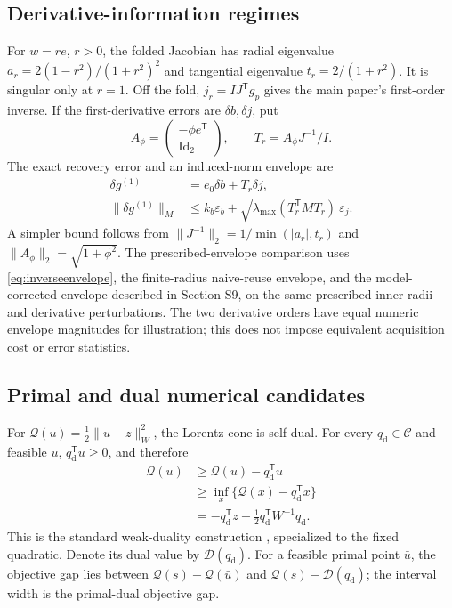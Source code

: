 \documentclass[10pt,a4paper]{article}
\begin{document}
\subsection{Derivative-information regimes}
For $w=re$, $r>0$, the folded Jacobian has radial eigenvalue $a_r=2(1-r^2)/(1+r^2)^2$ and tangential eigenvalue $t_r=2/(1+r^2)$. It is singular only at $r=1$. Off the fold, $j_r=IJ^{\mathsf T}g_p$ gives the main paper's first-order inverse. If the first-derivative errors are $\delta b,\delta j$, put
\begin{equation}
 A_\phi=\begin{pmatrix}-\phi e^{\mathsf T}\\\operatorname{Id}_2\end{pmatrix},\qquad
 T_r=A_\phi J^{-1}/I.
 \label{eq:inverseerroroperator}
\end{equation}
The exact recovery error and an induced-norm envelope are
\begin{equation}
 \begin{aligned}
 \delta g^{(1)}&=e_0\delta b+T_r\delta j,\\
 \|\delta g^{(1)}\|_M&\leq k_b\varepsilon_b+
 \sqrt{\lambda_{\max}(T_r^{\mathsf T}MT_r)}\,\varepsilon_j.
 \end{aligned}
 \label{eq:inverseenvelope}
\end{equation}
A simpler bound follows from $\|J^{-1}\|_2=1/\min(|a_r|,t_r)$ and $\|A_\phi\|_2=\sqrt{1+\phi^2}$. The prescribed-envelope comparison uses \eqref{eq:inverseenvelope}, the finite-radius naive-reuse envelope, and the model-corrected envelope described in Section S9, on the same prescribed inner radii and derivative perturbations. The two derivative orders have equal numeric envelope magnitudes for illustration; this does not impose equivalent acquisition cost or error statistics.

\subsection{Primal and dual numerical candidates}
For $\mathcal Q(u)=\tfrac12\|u-z\|_W^2$, the Lorentz cone is self-dual. For every $q_{\mathrm d}\in\mathcal C$ and feasible $u$, $q_{\mathrm d}^{\mathsf T}u\geq0$, and therefore
\begin{equation}
 \begin{aligned}
 \mathcal Q(u)&\geq \mathcal Q(u)-q_{\mathrm d}^{\mathsf T}u\\
 &\geq\inf_x\{\mathcal Q(x)-q_{\mathrm d}^{\mathsf T}x\}\\
 &=-q_{\mathrm d}^{\mathsf T}z-\tfrac12q_{\mathrm d}^{\mathsf T}W^{-1}q_{\mathrm d}.
 \end{aligned}
 \label{eq:dualgapderivation}
\end{equation}
This is the standard weak-duality construction \cite{supp-cvxbook}, specialized to the fixed quadratic. Denote its dual value by $\mathcal D(q_{\mathrm d})$. For a feasible primal point $\bar u$, the objective gap lies between $\mathcal Q(s)-\mathcal Q(\bar u)$ and $\mathcal Q(s)-\mathcal D(q_{\mathrm d})$; the interval width is the primal-dual objective gap.
\end{document}
